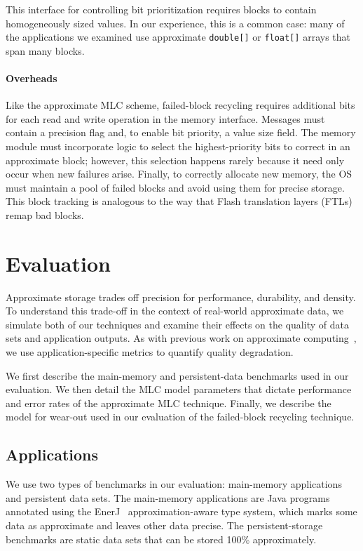 \documentclass[prodmode,acmtocs]{acmsmall}
\begin{document}
This interface for controlling bit prioritization requires blocks to contain
homogeneously sized values. In our experience, this is a common case: many of
the applications we examined use approximate
\texttt{double[]} or \texttt{float[]} arrays that span many blocks.

\paragraph{Overheads}

Like the approximate MLC scheme, failed-block recycling requires additional
bits for each read and write operation in the memory interface.
Messages must contain a precision flag and, to enable bit priority, a value
size field.
The memory module must incorporate logic to select the highest-priority bits
to correct in an approximate block; however, this selection happens rarely
because it need only occur when new failures arise.
Finally, to correctly allocate new memory, the OS must maintain a pool of
failed blocks and avoid using them for precise storage.
This block tracking is analogous to the way that Flash translation
layers (FTLs) remap bad blocks.


\section{Evaluation}
\label{sec:eval}

Approximate storage trades off precision for performance, durability, and density.
To understand this trade-off in the context of real-world approximate data, we
simulate both of our techniques and examine their effects on the quality of
data sets and application outputs. As with previous work on approximate
computing~\cite{enerj,npu,perforation}, we use
application-specific metrics to quantify quality
degradation.

We first describe the main-memory and persistent-data benchmarks used in our
evaluation. We then detail the MLC model parameters that dictate performance
and error rates of the approximate MLC technique. Finally, we describe the
model for wear-out used in our evaluation of the failed-block recycling
technique.

\subsection{Applications}

We use two types of benchmarks in our evaluation: main-memory applications and
persistent data sets. The main-memory applications are Java programs annotated
using the EnerJ~\cite{enerj} approximation-aware type system, which marks some
data as approximate and leaves other data precise. The persistent-storage
benchmarks are static data sets that can be stored 100\% approximately.
\end{document}
